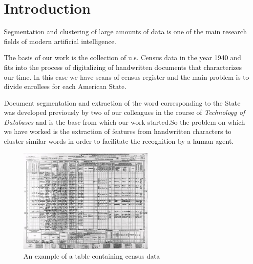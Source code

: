 \section{Introduction}
Segmentation and clustering of large amounts of data is one of the main research fields of modern artificial intelligence.

The basis of our work is the collection of u.s. Census data in the year 1940 and fits into the process of digitalizing of handwritten documents that characterizes our time. In this case we have scans of census register and the main problem is to divide enrollees for each American State.

Document segmentation and extraction of the word corresponding to the State was developed previously by two of our colleagues in the course of \emph{Technology of Databases} and is the base from which our work started.So the problem on which we have worked is the extraction of features from handwritten characters to cluster similar words in order to facilitate the recognition by a human agent.

\begin{figure}[!ht]
\centering
\includegraphics[width=0.6\textwidth]{images/img1.jpg}
\caption{An example of a table containing census data}
\end{figure}